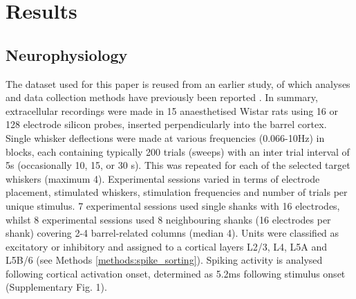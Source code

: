 \documentclass{article}
\begin{document}

\section{Results}

\subsection*{Neurophysiology}

The dataset used for this paper is reused from an earlier study, of which analyses and data collection methods have previously been reported \cite{reyes2014laminar}. In summary, extracellular recordings were made in 15 anaesthetised Wistar rats using 16 or 128 electrode silicon probes, inserted perpendicularly into the barrel cortex. Single whisker deflections were made at various frequencies (0.066-10Hz) in blocks, each containing typically 200 trials (sweeps) with an inter trial interval of 5s (occasionally 10, 15, or 30 s). This was repeated for each of the selected target whiskers (maximum 4). Experimental sessions varied in terms of electrode placement, stimulated whiskers, stimulation frequencies and number of trials per unique stimulus. 7 experimental sessions used single shanks with 16 electrodes, whilst 8 experimental sessions used 8 neighbouring shanks (16 electrodes per shank) covering 2-4 barrel-related columns (median 4). Units were classified as excitatory or inhibitory and assigned to a cortical layers L2/3, L4, L5A and L5B/6 (see Methods \ref{methods:spike_sorting}). Spiking activity is analysed following cortical activation onset, determined as 5.2ms following stimulus onset (Supplementary Fig. 1).
\end{document}
